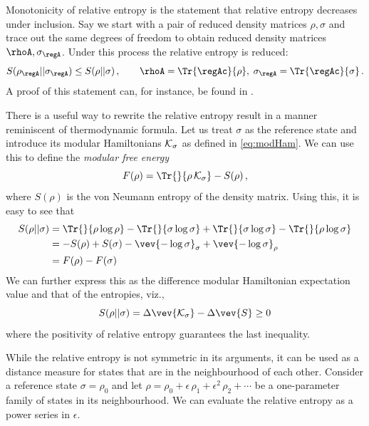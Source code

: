 \documentclass[12pt,openany]{book}
\begin{document}
Monotonicity of relative entropy is the statement that relative entropy decreases under inclusion.
Say we start with a pair of reduced density matrices $\rho, \sigma$ and trace out the same  degrees of freedom  to obtain reduced density matrices $\rhoA,\sigma_\regA$. Under this process the relative entropy is reduced:
%
\begin{equation}
S(\rho_\regA || \sigma_\regA ) \leq S(\rho || \sigma) \,, \qquad \rhoA = \Tr{{\regAc}}{\rho}, \;
\sigma_\regA = \Tr{{\regAc}}{\sigma} \,.
\label{eq:relmon}
\end{equation}
%
 A proof of this statement can, for instance, be found in \cite{Nielsen:2010aa}.

There is a useful way to rewrite the relative entropy result in a manner reminiscent of thermodynamic formula.
Let us treat $\sigma$ as the reference state and introduce its modular Hamiltonians ${\cal K}_\sigma$ as defined in \eqref{eq:modHam}. We can use this to define the \emph{modular free energy}
%
\begin{equation}
F(\rho) = \Tr{}{\rho \, {\cal K}_\sigma} -S(\rho)\,,
\label{eq:modfree}
\end{equation}
%
where $S(\rho)$ is the von Neumann entropy of the density matrix. Using this, it is easy to see that
%
\begin{equation}
\begin{split}
S(\rho|| \sigma) &= \Tr{}{\rho \log \rho} - \Tr{}{\sigma \log\sigma}+\Tr{}{\sigma \log\sigma} -
 \Tr{}{\rho \log\sigma}\\
&= -S(\rho) + S(\sigma) - \vev{-\log\sigma}_\sigma + \vev{-\log\sigma}_\rho\\
& = F(\rho) - F(\sigma)
\end{split}
\label{eq:relfree0}
\end{equation}
%
We can further express this as the difference modular Hamiltonian expectation value and that of the entropies, viz.,
%
\begin{equation}
S(\rho|| \sigma)  =\Delta\vev{{\cal K}_\sigma} - \Delta\vev{S} \geq 0
\label{eq:relfree}
\end{equation}
%
where the positivity of relative entropy guarantees the last inequality.

While the relative entropy is not symmetric in its arguments, it can be used as a distance measure for states that are in the neighbourhood of each other. Consider a reference state $\sigma = \rho_0$ and let
$\rho=\rho_0+\epsilon\,\rho_1  + \epsilon^2\, \rho_2 + \cdots$ be a one-parameter family of states in its  neighbourhood. We can evaluate the relative entropy as a power series in $\epsilon$.
\end{document}
